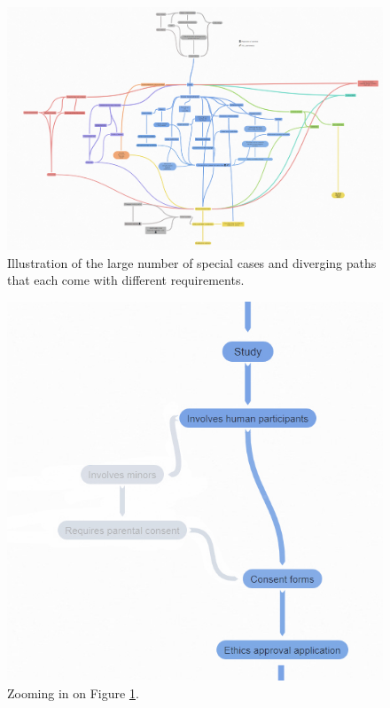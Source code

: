 \documentclass[10pt]{article}
\begin{document}
\begin{figure}
\centering
	\includegraphics[width=1\textwidth]{img/processflow.jpg}
	\caption{Illustration of the large number of special cases and diverging paths that each come with different requirements.}
	\label{somanypaths}
\end{figure}	
\begin{figure}
\centering
	\includegraphics[width=1\textwidth]{img/processflowhlite.jpg}
	\caption{Zooming in on Figure \ref{somanypaths}.}
	\label{fewerpaths}
\end{figure}
\end{document}
